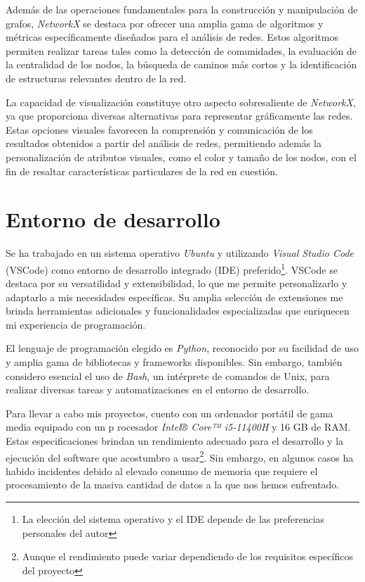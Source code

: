 Además de las operaciones fundamentales para la construcción y manipulación de grafos, \emph{NetworkX} se
destaca por ofrecer una amplia gama de algoritmos y métricas específicamente diseñados para el análisis de redes. 
Estos algoritmos permiten realizar tareas tales como la detección de comunidades, la evaluación de la centralidad de 
los nodos, la búsqueda de caminos más cortos y la identificación de estructuras relevantes dentro de la red.

La capacidad de visualización constituye otro aspecto sobresaliente de \emph{NetworkX}, ya que proporciona 
diversas alternativas para representar gráficamente las redes. Estas opciones visuales favorecen la comprensión 
y comunicación de los resultados obtenidos a partir del análisis de redes, permitiendo además la personalización 
de atributos visuales, como el color y tamaño de los nodos, con el fin de resaltar características particulares 
de la red en cuestión.

\section{Entorno de desarrollo}

Se ha trabajado en un sistema operativo \textit{Ubuntu} y utilizando \textit{Visual Studio Code} 
(VSCode) como entorno de desarrollo integrado (IDE) preferido\footnote{ La elección del sistema 
operativo y el IDE depende de las preferencias personales del autor}. VSCode se destaca por 
su versatilidad y extensibilidad, lo que me permite personalizarlo y adaptarlo a mis necesidades 
específicas. Su amplia selección de extensiones me brinda herramientas adicionales y funcionalidades 
especializadas que enriquecen mi experiencia de programación.

El lenguaje de programación elegido es \textit{Python}, reconocido por su facilidad de uso y amplia 
gama de bibliotecas y frameworks disponibles. Sin embargo, también considero esencial el uso de \textit{Bash}, 
un intérprete de comandos de Unix, para realizar diversas tareas y automatizaciones en el entorno 
de desarrollo.

Para llevar a cabo mis proyectos, cuento con un ordenador portátil de gama media equipado con un p
rocesador \textit{Intel® Core™ i5-11400H} y 16 GB de RAM. Estas especificaciones brindan un rendimiento 
adecuado para el desarrollo y la ejecución del software que acostumbro a usar\footnote{ Aunque el 
rendimiento puede variar dependiendo de los requisitos específicos del proyecto}. Sin embargo, en 
algunos casos ha habido incidentes debido al elevado consumo de memoria que requiere el procesamiento 
de la masiva cantidad de datos a la que nos hemos enfrentado.

